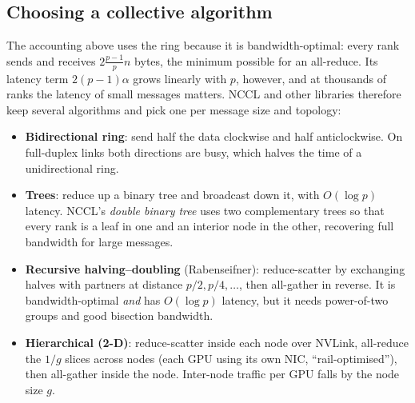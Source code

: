 \subsection{Choosing a collective algorithm}

The accounting above uses the ring because it is bandwidth-optimal: every rank sends and receives
$2\frac{p-1}{p}n$ bytes, the minimum possible for an all-reduce. Its latency term $2(p-1)\alpha$
grows linearly with $p$, however, and at thousands of ranks the latency of small messages matters.
NCCL and other libraries therefore keep several algorithms and pick one per message size and
topology:

\begin{itemize}
  \item \textbf{Bidirectional ring}: send half the data clockwise and half anticlockwise. On
    full-duplex links both directions are busy, which halves the time of a unidirectional ring.
  \item \textbf{Trees}: reduce up a binary tree and broadcast down it, with $O(\log p)$ latency.
    NCCL's \emph{double binary tree} uses two complementary trees so that every rank is a leaf in
    one and an interior node in the other, recovering full bandwidth for large messages.
  \item \textbf{Recursive halving--doubling} (Rabenseifner): reduce-scatter by exchanging
    halves with partners at distance $p/2, p/4,\dots$, then all-gather in reverse. It is
    bandwidth-optimal \emph{and} has $O(\log p)$ latency, but it needs power-of-two groups and
    good bisection bandwidth.
  \item \textbf{Hierarchical (2-D)}: reduce-scatter inside each node over NVLink, all-reduce
    the $1/g$ slices across nodes (each GPU using its own NIC, ``rail-optimised''), then all-gather
    inside the node. Inter-node traffic per GPU falls by the node size $g$.
\end{itemize}

